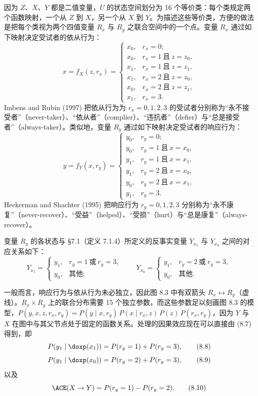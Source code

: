 因为 $Z$、$X$、$Y$ 都是二值变量，$U$ 的状态空间划分为 16 个等价类：每个类规定两个函数映射，一个从 $Z$ 到 $X$，另一个从 $X$ 到 $Y$。为描述这些等价类，方便的做法是把每个类视为两个四值变量 $R_x$ 与 $R_y$ 之联合空间中的一个点。变量 $R_x$ 通过如下映射决定受试者的依从行为：
\begin{equation}
x=f_X(z,r_x)=
\begin{cases}
x_0, & r_x=0;\\
x_0, & r_x=1\ \text{且}\ z=z_0,\\
x_1, & r_x=1\ \text{且}\ z=z_1,\\
x_1, & r_x=2\ \text{且}\ z=z_0,\\
x_0, & r_x=2\ \text{且}\ z=z_1,\\
x_1, & r_x=3.
\end{cases} \tag{8.6}
\end{equation}
Imbens and Rubin (1997) 把依从行为为 $r_x=0,1,2,3$ 的受试者分别称为“永不接受者”（never-taker）、“依从者”（complier）、“违抗者”（defier）与“总是接受者”（always-taker）。类似地，变量 $R_y$ 通过如下映射决定受试者的响应行为：
\begin{equation}
y=f_Y(x,r_y)=
\begin{cases}
y_0, & r_y=0;\\
y_0, & r_y=1\ \text{且}\ x=x_0,\\
y_1, & r_y=1\ \text{且}\ x=x_1,\\
y_1, & r_y=2\ \text{且}\ x=x_0,\\
y_0, & r_y=2\ \text{且}\ x=x_1,\\
y_1, & r_y=3.
\end{cases} \tag{8.7}
\end{equation}
Heckerman and Shachter (1995) 把响应行为 $r_y=0,1,2,3$ 分别称为“永不康复”（never-recover）、“受益”（helped）、“受损”（hurt）与“总是康复”（always-recover）。

变量 $R_y$ 的各状态与 \S 7.1（定义 7.1.4）所定义的反事实变量 $Y_{x_1}$ 与 $Y_{x_0}$ 之间的对应关系如下：
\[
Y_{x_1}=
\begin{cases}
y_1, & r_y=1\ \text{或}\ r_y=3,\\
y_0, & \text{其他};
\end{cases}
\qquad
Y_{x_0}=
\begin{cases}
y_1, & r_y=2\ \text{或}\ r_y=3,\\
y_0, & \text{其他}.
\end{cases}
\]

一般而言，响应行为与依从行为未必独立，因此图 8.3 中有双箭头 $R_x\longleftrightarrow R_y$（虚线）。$R_x\times R_y$ 上的联合分布需要 15 个独立参数，而这些参数足以刻画图 8.3 的模型，$P(y,x,z,r_x,r_y)=P(y\mid x,r_y)\,P(x\mid r_x,z)\,P(z)\,P(r_x,r_y)$，因为 $Y$ 与 $X$ 在图中与其父节点处于固定的函数关系。处理的因果效应现在可以直接由 \textup{(8.7)} 得到，即
\begin{equation}
P(y_1\mid\doxp(x_1))=P(r_y=1)+P(r_y=3), \tag{8.8}
\end{equation}
\begin{equation}
P(y_1\mid\doxp(x_0))=P(r_y=2)+P(r_y=3), \tag{8.9}
\end{equation}
以及
\begin{equation}
\ACE(X\to Y)=P(r_y=1)-P(r_y=2). \tag{8.10}
\end{equation}

